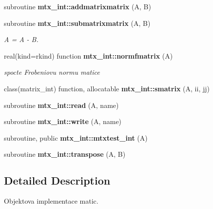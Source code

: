 \begin{DoxyCompactItemize}
subroutine {\bf mtx\+\_\+int\+::addmatrixmatrix} (A, B)
\item 
subroutine {\bf mtx\+\_\+int\+::submatrixmatrix} (A, B)
\begin{DoxyCompactList}\small\item\em A = A -\/ B. \end{DoxyCompactList}\item 
real(kind=rkind) function {\bf mtx\+\_\+int\+::normfmatrix} (A)
\begin{DoxyCompactList}\small\item\em spocte Frobeniovu normu matice \end{DoxyCompactList}\item 
class(matrix\+\_\+int) function, allocatable {\bf mtx\+\_\+int\+::smatrix} (A, ii, jj)
\item 
subroutine {\bf mtx\+\_\+int\+::read} (A, name)
\item 
subroutine {\bf mtx\+\_\+int\+::write} (A, name)
\item 
subroutine, public {\bf mtx\+\_\+int\+::mtxtest\+\_\+int} (A)
\item 
subroutine {\bf mtx\+\_\+int\+::transpose} (A, B)
\end{DoxyCompactItemize}


\subsection{Detailed Description}
Objektova implementace matic. 


